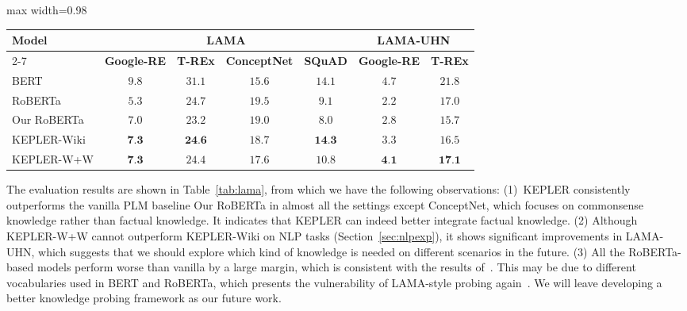 \begin{table*}[t]
\centering
\begin{adjustbox}{max width=0.98\linewidth}
\begin{tabular}{l|cccc|cc}
\toprule
\multirow{2}{*}{\textbf{Model}} & \multicolumn{4}{c|}{\textbf{LAMA}}                                         & \multicolumn{2}{c}{\textbf{LAMA-UHN}} \\ \cmidrule{2-7} 
                                & \textbf{Google-RE} & \textbf{T-REx} & \textbf{ConceptNet} & \textbf{SQuAD} & \textbf{Google-RE}  & \textbf{T-REx}  \\ \midrule
BERT                       & $9.8$              & $31.1$         & $15.6$              & $14.1$         &  $4.7$         & $21.8$              \\
RoBERTa                         & $5.3$              & $24.7$         & $19.5$              & $9.1$          & $2.2$               & $17.0$          \\ \midrule
Our RoBERTa                     & $7.0$              & $23.2$         & $\bm{19.0}$              & $8.0$          & $2.8$               & $15.7$          \\
KEPLER-Wiki                     & $\textbf{7.3}$              & $\textbf{24.6}$         & $18.7$              & $\textbf{14.3}$         & $3.3$               & $16.5$          \\
KEPLER-W+W                      & $\textbf{7.3}$              & $24.4$         & $17.6$              & $10.8$         & $\textbf{4.1}$               & $\textbf{17.1}$          \\ \bottomrule
\end{tabular}
\end{adjustbox}
	\caption{P@1 results on knowledge probing benchmark LAMA and LAMA-UHN.}
	\label{tab:lama}
\end{table*}


The evaluation results are shown in Table~\ref{tab:lama}, from which we have the following observations: (1)~KEPLER consistently outperforms the vanilla PLM baseline Our RoBERTa in almost all the settings except ConceptNet, which focuses on commonsense knowledge rather than factual knowledge. It indicates that KEPLER can indeed better integrate factual knowledge. (2) Although KEPLER-W+W cannot outperform KEPLER-Wiki on NLP tasks (Section~\ref{sec:nlpexp}), it shows significant improvements in LAMA-UHN, which suggests that we should explore which kind of knowledge is needed on different scenarios in the future. (3) All the RoBERTa-based models perform worse than vanilla \BERTBASE by a large margin, which is consistent with the results of~\citet{Wang2020KAdapter}. This may be due to different vocabularies used in BERT and RoBERTa, which presents the vulnerability of LAMA-style probing again~\citep{kassner-schutze-2020-negated}. We will leave developing a better knowledge probing framework as our future work.



